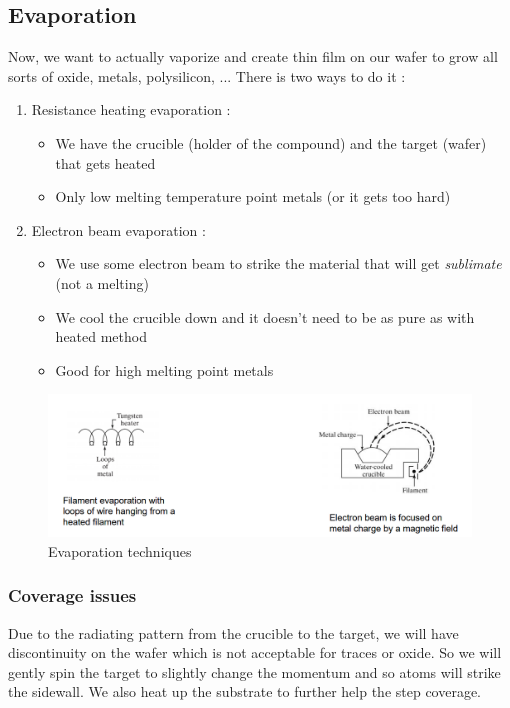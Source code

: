 \documentclass{report}
\begin{document}
\subsection{Evaporation}

Now, we want to actually vaporize and create thin film on our wafer to grow all sorts of oxide, metals, polysilicon,  ... There is two ways to do it :

\begin{enumerate}
    \item Resistance heating evaporation : 
    \begin{itemize}
        \item We have the crucible (holder of the compound) and the target (wafer) that gets heated
        \item Only low melting temperature point metals (or it gets too hard)
    \end{itemize}
    \item Electron beam evaporation :
    \begin{itemize}
        \item We use some electron beam to strike the material that will get \textit{sublimate} (not a melting)
        \item We cool the crucible down and it doesn't need to be as pure as with heated method
        \item Good for high melting point metals
    \end{itemize}
\end{enumerate}

\begin{figure}[H]
    \centering
    \includegraphics[width=0.85\linewidth]{evaporation_method.png}
    \caption{Evaporation techniques}
    \label{fig:evap-label}
\end{figure}

\subsubsection{Coverage issues}

Due to the radiating pattern from the crucible to the target, we will have discontinuity on the wafer which is not acceptable for traces or oxide. So we will gently spin the target to slightly change the momentum and so atoms will strike the sidewall. We also heat up the substrate to further help the step coverage.
\end{document}
